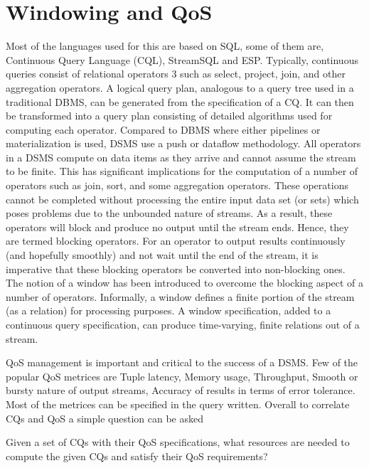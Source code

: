 \section{Windowing and QoS}
Most of the languages used for this are based on SQL, some of them are,  Continuous Query Language (CQL), StreamSQL and ESP. Typically, continuous queries consist of relational operators 3 such as select, project, join, and other aggregation operators. A logical query plan, analogous to a query tree used in a traditional DBMS, can be generated from the specification of a CQ. It can then be transformed into a query plan consisting of detailed algorithms used for computing each operator. Compared to DBMS where either pipelines or materialization is used, DSMS use a push or dataflow methodology. All operators in a DSMS compute on data items as they arrive and cannot assume the stream to be finite. This has significant implications for the computation of a number of operators such as join, sort, and some aggregation operators. These operations cannot be completed without processing the entire input data set (or sets) which poses problems due to the unbounded nature of streams. As a result, these operators will block and produce no output until the stream ends. Hence, they are termed blocking operators. For an operator to output results continuously (and hopefully smoothly) and not wait until the end of the stream, it is imperative that these blocking operators be converted into non-blocking ones. The notion of a window has been introduced to overcome the blocking aspect of a number of operators. Informally, a window defines a finite portion of the stream (as a relation) for processing purposes. A window specification, added to a continuous query specification, can produce time-varying, finite relations out of a stream.
\par QoS management is important and critical to the success of a DSMS. Few of the popular QoS metrices are Tuple latency, Memory usage, Throughput, Smooth or bursty nature of output streams, Accuracy of results in terms of error tolerance. Most of the metrices can be specified in the query written. Overall to correlate CQs and QoS a simple question can be asked 
\begin{center}
Given a set of CQs with their QoS specifications, what resources are needed to compute the given CQs and satisfy their QoS requirements?
\end{center}

